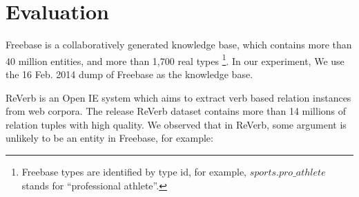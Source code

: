 



\section{Evaluation}


Freebase \cite{bollacker2008freebase} is a collaboratively generated knowledge base,
which contains more than 40 million entities, and more than 1,700 real types
\footnote{Freebase types are identified by type id, for example, $sports.pro\_athlete$ stands for ``professional athlete''.}.
In our experiment, We use the 16 Feb. 2014 dump of Freebase as the knowledge
base.

ReVerb \cite{fader2011identifying} is an Open IE system
which aims to extract verb based relation instances from web corpora.
The release ReVerb dataset contains more than 14 millions of relation tuples with high quality.
We observed that in ReVerb, some argument is unlikely to be an entity in Freebase, for example:

